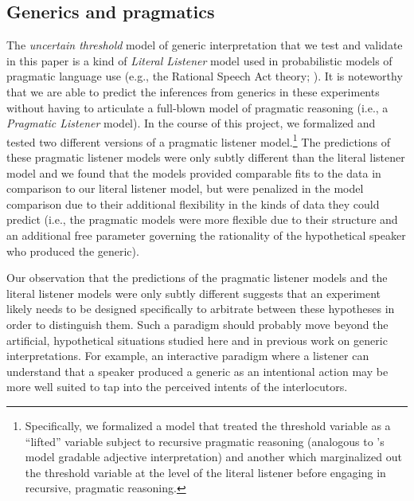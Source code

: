 \documentclass[floatsintext,man]{apa6}
\let\rmarkdownfootnote\footnote%
\def\footnote{\protect\rmarkdownfootnote}
\begin{document}
\subsection{Generics and pragmatics}

The \emph{uncertain threshold} model of generic interpretation that we test and validate in this paper is a kind of \emph{Literal Listener} model used in probabilistic models of pragmatic language use (e.g., the Rational Speech Act theory; ). 
It is noteworthy that we are able to predict the inferences from generics in these experiments without having to articulate a full-blown model of pragmatic reasoning (i.e., a \emph{Pragmatic Listener} model). 
In the course of this project, we formalized and tested two different versions of a pragmatic listener model.\footnote{Specifically, we formalized a model that treated the threshold variable as a ``lifted'' variable subject to recursive pragmatic reasoning (analogous to 's model gradable adjective interpretation) and another which marginalized out the threshold variable at the level of the literal listener before engaging in recursive, pragmatic reasoning.}
The predictions of these pragmatic listener models were only subtly different than the literal listener model and we found that the models provided comparable fits to the data in comparison to our literal listener model, but were penalized in the model comparison due to their additional flexibility in the kinds of data they could predict (i.e., the pragmatic models were more flexible due to their structure and an additional free parameter governing the rationality of the hypothetical speaker who produced the generic). 

Our observation that the predictions of the pragmatic listener models and the literal listener models were only subtly different suggests that an experiment likely needs to be designed specifically to arbitrate between these hypotheses in order to distinguish them.
Such a paradigm should probably move beyond the artificial, hypothetical situations studied here and in previous work on generic interpretations. 
For example, an interactive paradigm where a listener can understand that a speaker produced a generic as an intentional action may be more well suited to tap into the perceived intents of the interlocutors. 



\end{document}
